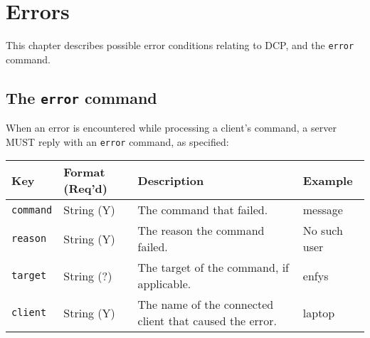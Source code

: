 \chapter{Errors}
\label{chap:errors}

This chapter describes possible error conditions relating to DCP, and the
\texttt{error} command.

\newpage



\section{The \texttt{error} command}
\sectionrule

When an error is encountered while processing a client's command, a server MUST
reply with an \texttt{error} command, as specified:

\begin{tabular}{l|l|l|l}
  \hline
  Key & Format (Req'd) & Description & Example \\
  \hline
  \hline
  \texttt{command}      & String (Y) &
  The command that failed.                                      & message \\
  \texttt{reason}       & String (Y) &
  The reason the command failed.                                & No such user \\
  \texttt{target}       & String (?) &
  The target of the command, if applicable.                     & enfys \\
  \texttt{client}       & String (Y) &
  The name of the connected client that caused the error.       & laptop \\
  \hline
\end{tabular}
